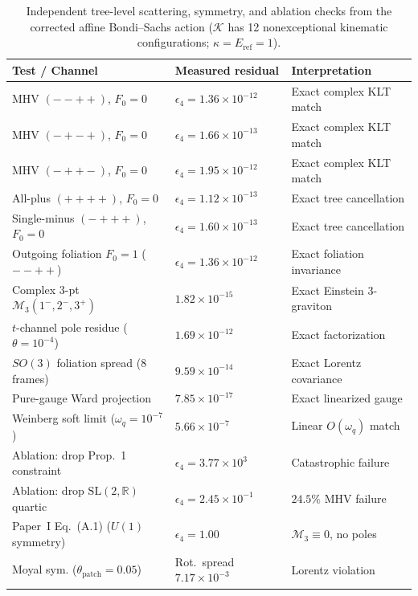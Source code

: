 \documentclass[11pt]{article}
\newcommand{\calK}{\mathcal{K}}
\newcommand{\calM}{\mathcal{M}}
\begin{document}
\begin{table}[t]
\centering
\caption{Independent tree-level scattering, symmetry, and ablation checks from the corrected affine Bondi--Sachs action ($\calK$ has 12 nonexceptional kinematic configurations; $\kappa = E_{\mathrm{ref}} = 1$).}
\label{tab:scattering}
\footnotesize
\begin{tabular}{@{}lll@{}}
\toprule
Test / Channel & Measured residual & Interpretation \\
\midrule
MHV $(--++)$, $F_0 = 0$ & $\epsilon_4 = 1.36\times 10^{-12}$ & Exact complex KLT match \\
MHV $(-+-+)$, $F_0 = 0$ & $\epsilon_4 = 1.66\times 10^{-13}$ & Exact complex KLT match \\
MHV $(-++-)$, $F_0 = 0$ & $\epsilon_4 = 1.95\times 10^{-12}$ & Exact complex KLT match \\
All-plus $(++++)$, $F_0 = 0$ & $\epsilon_4 = 1.12\times 10^{-13}$ & Exact tree cancellation \\
Single-minus $(-+++)$, $F_0 = 0$ & $\epsilon_4 = 1.60\times 10^{-13}$ & Exact tree cancellation \\
Outgoing foliation $F_0 = 1$ ($--++$) & $\epsilon_4 = 1.36\times 10^{-12}$ & Exact foliation invariance \\
Complex 3-pt $\calM_3(1^-,2^-,3^+)$ & $1.82\times 10^{-15}$ & Exact Einstein 3-graviton \\
$t$-channel pole residue ($\theta = 10^{-4}$) & $1.69\times 10^{-12}$ & Exact factorization \\
$SO(3)$ foliation spread (8 frames) & $9.59\times 10^{-14}$ & Exact Lorentz covariance \\
Pure-gauge Ward projection & $7.85\times 10^{-17}$ & Exact linearized gauge \\
Weinberg soft limit ($\omega_q = 10^{-7}$) & $5.66\times 10^{-7}$ & Linear $O(\omega_q)$ match \\
\midrule
Ablation: drop Prop.~1 constraint & $\epsilon_4 = 3.77\times 10^{3}$ & Catastrophic failure \\
Ablation: drop $\mathrm{SL}(2,\mathbb{R})$ quartic & $\epsilon_4 = 2.45\times 10^{-1}$ & $24.5\%$ MHV failure \\
Paper~I Eq.~(A.1) ($U(1)$ symmetry) & $\epsilon_4 = 1.00$ & $\calM_3 \equiv 0$, no poles \\
Moyal sym. ($\theta_{\mathrm{patch}} = 0.05$) & Rot.\ spread $7.17\times 10^{-3}$ & Lorentz violation \\
\bottomrule
\end{tabular}
\end{table}
\end{document}
